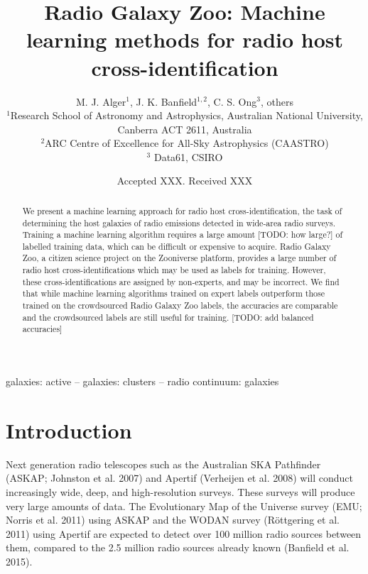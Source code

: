 \documentclass[fleqn,usenatbib,usedcolumn]{mnras}
\title[ML CDFS]{Radio Galaxy Zoo: Machine learning methods for radio host cross-identification}
\author[RGZ ML Team]{M. J. Alger$^{1}$, J. K. Banfield$^{1, 2}$, C. S. Ong$^{3}$, others
\\
$^{1}$Research School of Astronomy and Astrophysics, Australian National University, Canberra ACT 2611, Australia\\
$^{2}$ARC Centre of Excellence for All-Sky Astrophysics (CAASTRO)\\
$^{3}$ Data61, CSIRO\\
}
\date{Accepted XXX. Received XXX}
\begin{document}
\label{firstpage}
\pagerange{\pageref{firstpage}--\pageref{lastpage}}
\maketitle

\begin{abstract}
  We present a machine learning approach for radio host cross-identification,
  the task of determining the host galaxies of radio emissions detected in
  wide-area radio surveys. Training a machine learning algorithm requires a
  large amount [TODO: how large?] of labelled training data, which can be
  difficult or expensive to acquire. Radio Galaxy Zoo, a citizen science
  project on the Zooniverse platform, provides a large number of radio host
  cross-identifications which may be used as labels for training. However,
  these cross-identifications are assigned by non-experts, and may be
  incorrect. We find that while machine learning algorithms trained on expert
  labels outperform those trained on the crowdsourced Radio Galaxy Zoo labels,
  the accuracies are comparable and the crowdsourced labels are still useful
  for training. [TODO: add balanced accuracies]
\end{abstract}

\begin{keywords}
galaxies: active -- galaxies: clusters -- radio continuum: galaxies
\end{keywords}


\section{Introduction}\label{introduction}

  Next generation radio telescopes such as the Australian SKA Pathfinder
  (ASKAP; Johnston et al. 2007) and Apertif (Verheijen et al. 2008) will
  conduct increasingly wide, deep, and high-resolution surveys. These
  surveys will produce very large amounts of data. The Evolutionary Map of
  the Universe survey (EMU; Norris et al. 2011) using ASKAP and the WODAN
  survey (Röttgering et al. 2011) using Apertif are expected to detect
  over 100 million radio sources between them, compared to the 2.5 million
  radio sources already known (Banfield et al. 2015).
\end{document}

